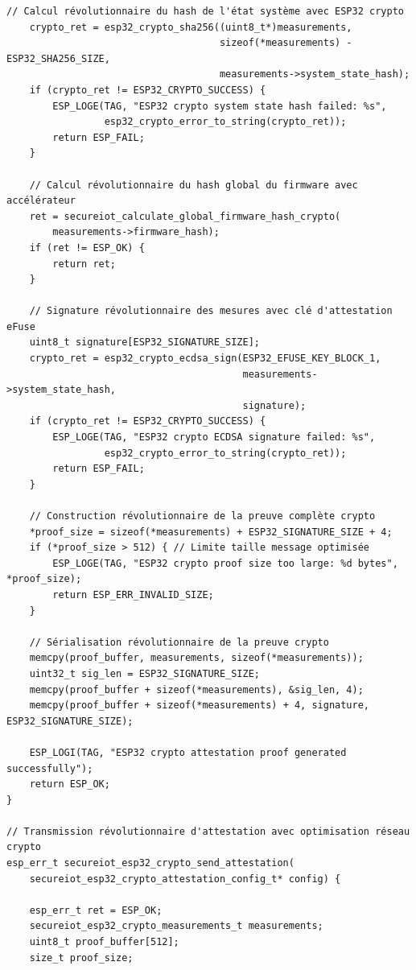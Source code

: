 \begin{lstlisting}[caption={Module révolutionnaire d'attestation ESP32 crypto intégré}]
    // Calcul révolutionnaire du hash de l'état système avec ESP32 crypto
    crypto_ret = esp32_crypto_sha256((uint8_t*)measurements, 
                                     sizeof(*measurements) - ESP32_SHA256_SIZE,
                                     measurements->system_state_hash);
    if (crypto_ret != ESP32_CRYPTO_SUCCESS) {
        ESP_LOGE(TAG, "ESP32 crypto system state hash failed: %s",
                 esp32_crypto_error_to_string(crypto_ret));
        return ESP_FAIL;
    }
    
    // Calcul révolutionnaire du hash global du firmware avec accélérateur
    ret = secureiot_calculate_global_firmware_hash_crypto(
        measurements->firmware_hash);
    if (ret != ESP_OK) {
        return ret;
    }
    
    // Signature révolutionnaire des mesures avec clé d'attestation eFuse
    uint8_t signature[ESP32_SIGNATURE_SIZE];
    crypto_ret = esp32_crypto_ecdsa_sign(ESP32_EFUSE_KEY_BLOCK_1,
                                         measurements->system_state_hash,
                                         signature);
    if (crypto_ret != ESP32_CRYPTO_SUCCESS) {
        ESP_LOGE(TAG, "ESP32 crypto ECDSA signature failed: %s",
                 esp32_crypto_error_to_string(crypto_ret));
        return ESP_FAIL;
    }
    
    // Construction révolutionnaire de la preuve complète crypto
    *proof_size = sizeof(*measurements) + ESP32_SIGNATURE_SIZE + 4;
    if (*proof_size > 512) { // Limite taille message optimisée
        ESP_LOGE(TAG, "ESP32 crypto proof size too large: %d bytes", *proof_size);
        return ESP_ERR_INVALID_SIZE;
    }
    
    // Sérialisation révolutionnaire de la preuve crypto
    memcpy(proof_buffer, measurements, sizeof(*measurements));
    uint32_t sig_len = ESP32_SIGNATURE_SIZE;
    memcpy(proof_buffer + sizeof(*measurements), &sig_len, 4);
    memcpy(proof_buffer + sizeof(*measurements) + 4, signature, ESP32_SIGNATURE_SIZE);
    
    ESP_LOGI(TAG, "ESP32 crypto attestation proof generated successfully");
    return ESP_OK;
}

// Transmission révolutionnaire d'attestation avec optimisation réseau crypto
esp_err_t secureiot_esp32_crypto_send_attestation(
    secureiot_esp32_crypto_attestation_config_t* config) {
    
    esp_err_t ret = ESP_OK;
    secureiot_esp32_crypto_measurements_t measurements;
    uint8_t proof_buffer[512];
    size_t proof_size;
    

\end{lstlisting}

